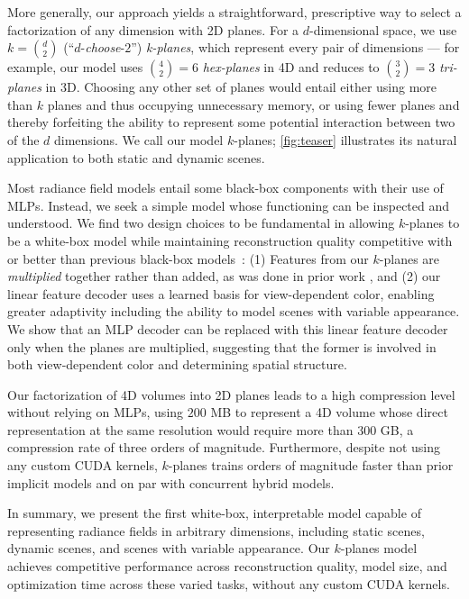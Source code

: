 \documentclass[10pt,twocolumn,letterpaper]{article}
\newcommand{\modelname}{$k$-planes}
\begin{document}
More generally, our approach yields a straightforward, prescriptive way to select a factorization of any dimension with 2D planes.
For a $d$-dimensional space, we use $k = \binom{d}{2}$ (``$d$-\textit{choose}-$2$'') \emph{k-planes}, which represent every pair of dimensions --- for example, our model uses $\binom{4}{2}=6$ \emph{hex-planes} in 4D and reduces to $\binom{3}{2}=3$ \emph{tri-planes} in 3D. Choosing any other set of planes would entail either using more than $k$ planes and thus occupying unnecessary memory, or using fewer planes and thereby forfeiting the ability to represent some potential interaction between two of the $d$ dimensions. We call our model \modelname{}; \cref{fig:teaser} illustrates its natural application to both static and dynamic scenes.

Most radiance field models entail some black-box components with their use of MLPs. 
Instead, we seek a simple model whose functioning can be inspected and understood. 
We find two design choices to be fundamental in allowing \modelname{} to be a white-box model while maintaining reconstruction quality competitive with or better than previous black-box models~\cite{dynerf, dnerf}:
(1) Features from our \modelname{} are \emph{multiplied} together rather than added, as was done in prior work \cite{triplane, tensorf}, and (2) our linear feature decoder uses a learned basis for view-dependent color, enabling greater adaptivity including the ability to model scenes with variable appearance. We show that an MLP decoder can be replaced with this linear feature decoder only when the planes are multiplied, suggesting that the former is involved in both view-dependent color and determining spatial structure.

Our factorization of 4D volumes into 2D planes leads to a high compression level without relying on MLPs, using $200$ MB to represent a 4D volume whose direct representation at the same resolution would require more than $300$ GB, a compression rate of three orders of magnitude.
Furthermore, despite not using any custom CUDA kernels, \modelname{} trains orders of magnitude faster than prior implicit models and on par with concurrent hybrid models.

In summary, we present the first white-box, interpretable model capable of representing radiance fields in arbitrary dimensions, including static scenes, dynamic scenes, and scenes with variable appearance. Our \modelname{} model achieves competitive performance across reconstruction quality, model size, and optimization time across these varied tasks, without any custom CUDA kernels.
\end{document}
